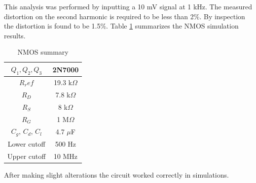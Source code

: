 	This analysis was performed by inputting a 10 mV signal at 1 kHz. The measured distortion on the second harmonic is required to be less than 2\%. By inspection the distortion is found to be 1.5\%. Table \ref{tab:nmossum} summarizes the NMOS simulation results.
	
	
	\begin{table}[H]
		\centering
		\caption{NMOS summary}
		\label{tab:nmossum}
		\begin{tabular}{|c|c|} \hline
			$Q_1, Q_2, Q_3$ & 2N7000        \\ \hline
			$R_ref$         & 19.3 k$\Omega$ \\ \hline
			$R_D$           & 7.8 k$\Omega$  \\ \hline
			$R_S$           & 8 k$\Omega$   \\ \hline
			$R_G$           & 1 M$\Omega$  \\ \hline
			$C_g$, $C_d$, $C_l$ & 4.7 $\mu$F   \\ \hline
			Lower cutoff    &  500 Hz \\    \hline
			Upper cutoff    & 10 MHz \\    \hline
			
			     
		\end{tabular}
	\end{table}

After making slight alterations the circuit worked correctly in simulations.
	
	
	
	
	